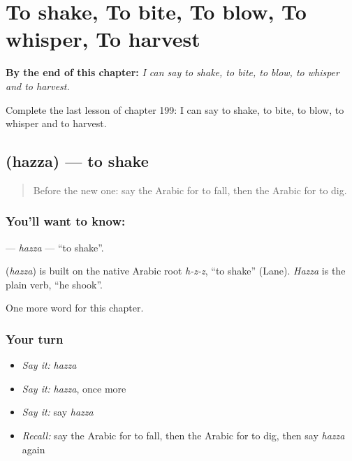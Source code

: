 
\chapter{To shake, To bite, To blow, To whisper, To harvest}
\label{ch:ar-to-shake-to-bite-to-blow-to-whisper-to-harvest}

\begin{chapteropening}
\textbf{By the end of this chapter:} \emph{I can say to shake, to bite, to blow, to whisper and to harvest.}

Complete the last lesson of chapter 199: I can say to shake, to bite, to blow, to whisper and to harvest.
\end{chapteropening}

\section[\texorpdfstring{\ar{هز} (hazza)}{هز (hazza)}]{ (hazza) — to shake}

\label{lesson:AR-C199-hazza}



\begin{quote}
Before the new one: say the Arabic for to fall, then the Arabic for to dig.
\end{quote}

\subsection*{You'll want to know: }
\textbf{} — \emph{hazza} — \textquotedblleft{}to shake\textquotedblright{}.

\begin{cousinweb}
\textbf{} (\emph{hazza}) is built on the native Arabic root \emph{h-z-z}, \textquotedblleft{}to shake\textquotedblright{} (Lane). \emph{Hazza} is the plain verb, \textquotedblleft{}he shook\textquotedblright{}.
\end{cousinweb}

\begin{grammarlens}[title={What you've built}]
One more word for this chapter.
\end{grammarlens}

\subsection*{Your turn}
\begin{itemize}
\raggedright
  \item \emph{Say it:} \emph{hazza}
  \item \emph{Say it:} \emph{hazza}, once more
  \item \emph{Say it:} say \emph{hazza}
  \item \emph{Recall:} say the Arabic for to fall, then the Arabic for to dig, then say \emph{hazza} again
\end{itemize}

